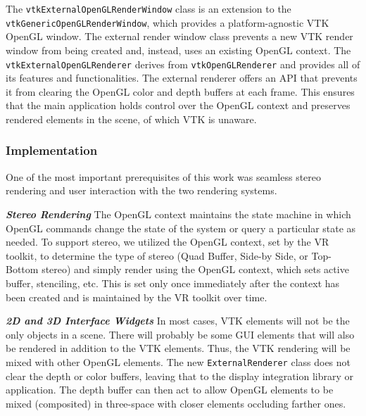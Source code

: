 The \texttt{vtkExternalOpenGLRenderWindow} class is an extension to the \texttt{vtkGenericOpenGLRenderWindow}, which provides a platform-agnostic VTK OpenGL window.
The external render window class prevents a new VTK render window from being created and, instead, uses an existing OpenGL context.
The \texttt{vtkExternalOpenGLRenderer} derives from \texttt{vtkOpenGLRenderer} and provides all of its features and functionalities.
The external renderer offers an API that prevents it from clearing the OpenGL color and depth buffers at each frame.
This ensures that the main application holds control over the OpenGL context and preserves rendered elements in the scene, of which VTK is unaware.

\subsubsection{Implementation}

One of the most important prerequisites of this work was seamless stereo rendering and user interaction with the two rendering systems. 

\textbf{\textit{Stereo Rendering}} The OpenGL context maintains the state machine in which OpenGL commands change the state of the system or query a particular state as needed.
To support stereo, we utilized the OpenGL context, set by the VR toolkit, to determine the type of stereo (Quad Buffer, Side-by Side, or Top-Bottom stereo) and simply render using the OpenGL context, which sets active buffer, stenciling, etc.
This is set only once immediately after the context has been created and is maintained by the VR toolkit over time. 

\textbf{\textit{2D and 3D Interface Widgets}} In most cases, VTK elements will not be the only objects in a scene.
There will probably be some GUI elements that will also be rendered in addition to the VTK elements.
Thus, the VTK rendering will be mixed with other OpenGL elements.
The new \texttt{ExternalRenderer} class does not clear the depth or color buffers, leaving that to the display integration library or application.
The depth buffer can then act to allow OpenGL elements to be mixed (composited) in three-space with closer elements occluding farther ones.

